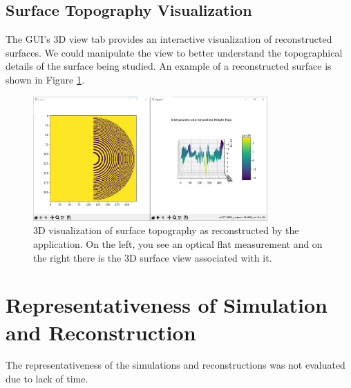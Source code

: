 \documentclass[../main.tex]{subfiles}
\begin{document}
\subsection{Surface Topography Visualization}
\vspace{-15pt}
The GUI's 3D view tab provides an interactive visualization of reconstructed surfaces. We could manipulate the view to better understand the topographical details of the surface being studied. An example of a reconstructed surface is shown in Figure \ref{fig:topography}.\\
\begin{figure}[H]
    \centering
    \includegraphics[width=0.8\textwidth, trim={1cm 1cm 1cm 1cm}, clip]{Images/Results/3D_reconstructie}
    \caption{3D visualization of surface topography as reconstructed by the application. On the left, you see an optical flat measurement and on the right there is the 3D surface view associated with it.}
    \label{fig:topography}
\end{figure}
\vspace{-25pt}
\section{Representativeness of Simulation and Reconstruction}
\vspace{-15pt}
The representativeness of the simulations and reconstructions was not evaluated due to lack of time. %
\end{document}
